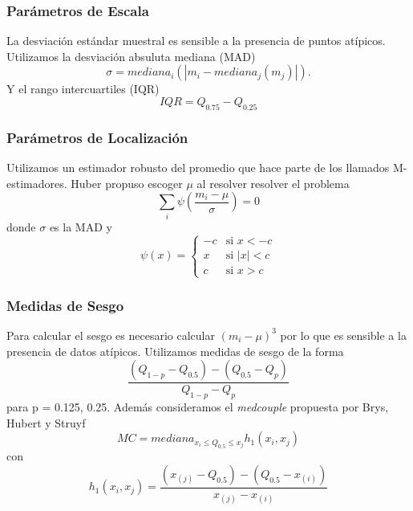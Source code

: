 \documentclass{beamer}
\begin{document}
\begin{frame}
  \frametitle{Parámetros de Escala}
  La desviación estándar muestral es sensible a la presencia de puntos atípicos. Utilizamos la desviación absuluta mediana (MAD)
  \begin{equation}
    \sigma = mediana_i(|m_i-mediana_j(m_j)|).
  \end{equation} 
  Y el rango intercuartiles (IQR)
  \begin{equation}
    IQR = Q_{0.75}-Q_{0.25}
  \end{equation}
\end{frame}

\begin{frame}
  \frametitle{Parámetros de Localización}
  Utilizamos un estimador robusto del promedio que hace parte de los llamados M-estimadores. Huber \cite{huber_robust_2011} propuso escoger $\mu$ al resolver resolver el problema 
  \begin{equation}
    \sum_i\psi\left(\frac{m_i-\mu}{\sigma}\right) = 0
  \end{equation}
  donde $\sigma$ es la MAD y 
  \begin{equation}
    \psi(x) = \begin{cases} 
      -c &\mbox{si } x < -c \\ 
      x & \mbox{si } |x|<c\\
      c & \mbox{si } x>c
    \end{cases}
  \end{equation}
\end{frame}

\begin{frame}
  \frametitle{Medidas de Sesgo}
  Para calcular el sesgo es necesario calcular $(m_i-\mu)^3$ por lo que es sensible a la presencia de datos atípicos. Utilizamos medidas de sesgo de la forma 
  \begin{equation}
    \frac{(Q_{1-p}-Q_{0.5})-(Q_{0.5}-Q_p)}{Q_{1-p}-Q_{p}}
  \end{equation}
  para p = 0.125, 0.25. Además consideramos el \textit{medcouple} propuesta por Brys, Hubert y Struyf \cite{brys_robust_2004}
  \begin{equation}
    MC = mediana_{x_i\leq Q_{0.5} \leq x_j} h_1(x_i,x_j)
  \end{equation}
  con
  \begin{equation}
    h_1(x_i,x_j) = \frac{(x_{(j)}-Q_{0.5})-(Q_{0.5}-x_{(i)})}{x_{(j)}-x_{(i)}}
  \end{equation}

\end{frame}
\end{document}
